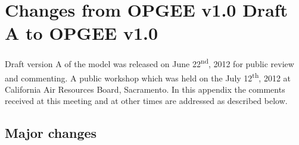 \documentclass[11pt]{report}
\begin{document}
\section{Changes from OPGEE v1.0 Draft A to OPGEE v1.0}

Draft version A of the model was released on June 22\textsuperscript{nd}, 2012 for public review and commenting. A public workshop which was held on the July 12\textsuperscript{th}, 2012 at California Air Resources Board, Sacramento. In this appendix the comments received at this meeting and at other times are addressed as described below.

\subsection{Major changes} \label{sec:majorchanges}
\end{document}
